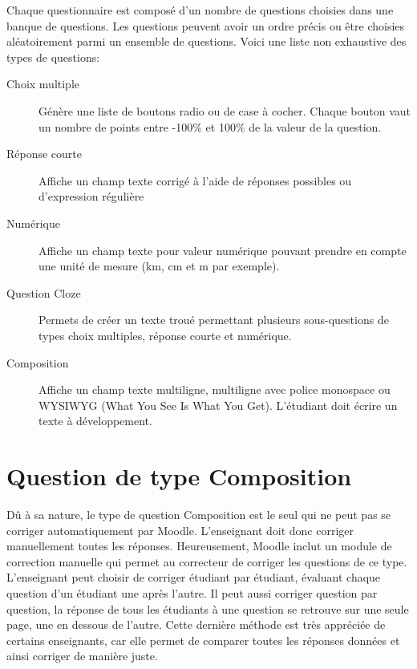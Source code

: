 Chaque questionnaire est composé d'un nombre de questions choisies dans une banque de questions.
Les questions peuvent avoir un ordre précis ou être choisies aléatoirement parmi un ensemble de questions.
Voici une liste non exhaustive des types de questions:

\begin{description}
  \item[Choix multiple]
  
  Génère une liste de boutons radio ou de case à cocher.
  Chaque bouton vaut un nombre de points entre -100\% et 100\% de la valeur de la question.
  
  \item[Réponse courte]
  
  Affiche un champ texte corrigé à l'aide de réponses possibles ou d'expression régulière
  
  \item[Numérique]
  
  Affiche un champ texte pour valeur numérique pouvant prendre en compte une unité de mesure (km, cm et m par exemple).
  
  \item[Question Cloze]
  
  Permets de créer un texte troué permettant plusieurs sous-questions de types choix multiples, réponse courte et numérique.
  
  \item[Composition]
  
  Affiche un champ texte multiligne, multiligne avec police monospace ou WYSIWYG (What You See Is What You Get).
  L'étudiant doit écrire un texte à développement.
\end{description}

\section{Question de type Composition}

Dû à sa nature, le type de question Composition est le seul qui ne peut pas se corriger automatiquement par Moodle.
L'enseignant doit donc corriger manuellement toutes les réponses.
Heureusement, Moodle inclut un module de correction manuelle qui permet au correcteur de corriger les questions de ce type.
L'enseignant peut choisir de corriger étudiant par étudiant, évaluant chaque question d'un étudiant une après l'autre.
Il peut aussi corriger question par question, la réponse de tous les étudiants à une question se retrouve sur une seule page, une en dessous de l'autre.
Cette dernière méthode est très appréciée de certains enseignants, car elle permet de comparer toutes les réponses données et ainsi corriger de manière juste.

